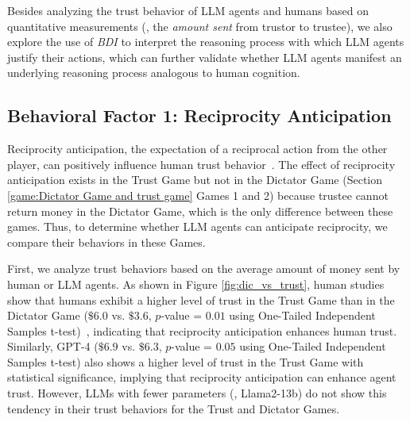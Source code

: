 Besides analyzing the trust behavior of LLM agents and humans based on quantitative measurements (\eg, the \textit{amount sent} from trustor to trustee), we also explore the use of \textit{BDI} to interpret the reasoning process with which LLM agents justify their actions, which can further validate whether LLM agents manifest an underlying reasoning process analogous to human cognition.

























\vspace{-2mm}
\subsection{Behavioral Factor 1: Reciprocity Anticipation}

Reciprocity anticipation, the expectation of a reciprocal action from the other player, can positively influence human trust behavior~\citep{berg1995trust}. The effect of reciprocity anticipation exists in the Trust Game but not in the Dictator Game (Section \ref{game:Dictator Game and trust game} Games 1 and 2) because trustee cannot return money in the Dictator Game, which is the only difference between these games.
Thus,  to determine whether LLM agents can anticipate reciprocity, we compare their behaviors in these Games.






















First, we analyze trust behaviors based on the average amount of money sent by  human or LLM agents.
As shown in Figure \ref{fig:dic_vs_trust}, human studies show that humans exhibit a higher level of trust in the Trust Game than in the Dictator Game ($\$6.0$ vs. $\$3.6$, $p$-value = $0.01$ using One-Tailed Independent Samples t-test)~\citep{coxHowIdentifyTrust2004b}, indicating that reciprocity anticipation enhances human trust. Similarly, GPT-4 ($\$6.9$ vs. $\$6.3$, $p$-value = $0.05$ using One-Tailed Independent Samples t-test) 
also shows a higher level of trust in the Trust Game with statistical significance, implying that reciprocity anticipation can enhance agent trust. However, LLMs with fewer parameters (\eg, Llama2-13b) do not show this tendency in their trust behaviors for the Trust and Dictator Games.




